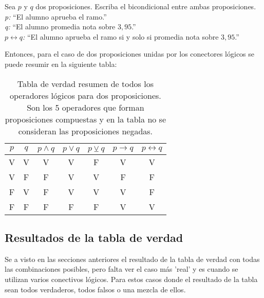 \begin{myexample}
Sea $p$ y $q$ dos proposiciones. Escriba el bicondicional entre ambas proposiciones.\\

 \noindent\textit{p:} ``El alumno aprueba el ramo.''\\
\textit{q:} ``El alumno promedia nota sobre $3,95$.''\\
\textit{$p\longleftrightarrow q$:} ``El alumno aprueba el ramo si y solo si promedia nota sobre $3,95$.''\\

\end{myexample} 
 
Entonces, para el caso de dos proposiciones unidas por los conectores lógicos se puede resumir en la siguiente tabla:

\begin{table}[h!]
	\begin{center}
		\begin{tabular}{||c|c||c|c|c|c|c||}
\hline
\hline
$p$&$q$&$p\wedge q$&$p\vee q$&$p\veebar q$&$p\rightarrow q$&$p\longleftrightarrow q$\\
\hline
V&V&V&V&F&V&V\\
\hline
V&F&F&V&V&F&F\\
\hline
F&V&F&V&V&V&F\\
\hline
F&F&F&F&F&V&V\\
\hline
\hline
		\end{tabular}
	\end{center}
\caption[Tabla de verdad resumen de todos los operadores lógicos.]{Tabla de verdad resumen de todos los operadores lógicos para dos proposiciones. Son los 5 operadores que forman proposiciones compuestas y en la tabla no se consideran las proposiciones negadas.}
\end{table}
 

\subsection{Resultados de la tabla de verdad}
Se a visto en las secciones anteriores el resultado de la tabla de verdad con todas las combinaciones posibles, pero falta ver el caso más 'real' y es cuando se utilizan varios conectivos lógicos. Para estos casos donde el resultado de la tabla sean todos verdaderos, todos falsos o una mezcla de ellos.\\


